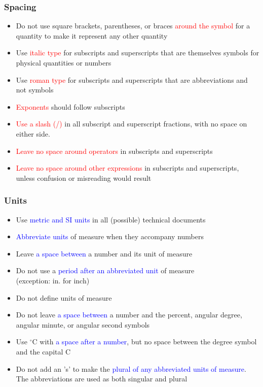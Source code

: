 \documentclass[newPxFont,sthlmFooter]{beamer}
\newcommand{\fs}{\footnotesize}
\begin{document}
\begin{frame}\frametitle{Spacing}
  \begin{itemize}
  \fs
  \item Do not use square brackets, parentheses, or braces \textcolor{red}{around the symbol} for a quantity to make it represent any other quantity
  \item Use \textcolor{red}{italic type} for subscripts and superscripts that are themselves symbols for physical quantities or numbers
  \item Use \textcolor{red}{roman type} for subscripts and superscripts that are abbreviations and not symbols
  \item \textcolor{red}{Exponents} should follow subscripts
  \item \textcolor{red}{Use a slash (/)} in all subscript and superscript fractions, with no space on either side.
  \item \textcolor{red}{Leave no space around operators} in subscripts and superscripts
  \item \textcolor{red}{Leave no space around other expressions} in subscripts and superscripts, unless confusion or misreading would result
  \end{itemize}
\end{frame}

\begin{frame}\frametitle{Units}
  \begin{itemize}
  \fs
  \item Use \textcolor{blue}{metric and SI units} in all (possible) technical documents
  \item \textcolor{blue}{Abbreviate units} of measure when they accompany numbers
  \item Leave \textcolor{blue}{a space between} a number and its unit of measure
  \item Do not use a \textcolor{blue}{period after an abbreviated unit} of measure\\ (exception: in. for inch)
  \item Do not define units of measure
  \item Do not leave \textcolor{blue}{a space between} a number and the percent, angular degree, angular minute, or angular second symbols
  \item Use $^\circ$C with \textcolor{blue}{a space after a number}, but no space between the degree symbol and the capital C
  \item Do not add an 's' to make the \textcolor{blue}{plural of any abbreviated units of measure}. The abbreviations are used as both singular and plural
  \end{itemize}
\end{frame}
\end{document}
